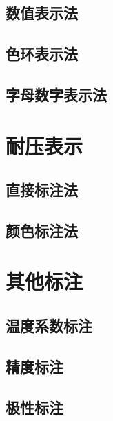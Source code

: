 \documentclass[12pt,UTF8]{ctexbook}
\begin{document}
\subsection{数值表示法}

\subsection{色环表示法}

\subsection{字母数字表示法}

\section{耐压表示}

\subsection{直接标注法}

\subsection{颜色标注法}

\section{其他标注}

\subsection{温度系数标注}

\subsection{精度标注}

\subsection{极性标注}

\backmatter
\end{document}
